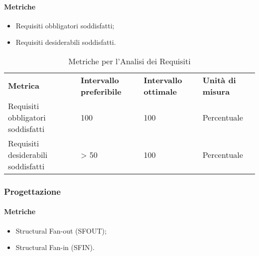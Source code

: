 \paragraph{Metriche}
\begin{itemize}
	\item Requisiti obbligatori soddisfatti;
	\item Requisiti desiderabili soddisfatti.
\end{itemize}
\renewcommand{\arraystretch}{2.2}
\begin{longtable}{|C{4.5cm}|C{2.25cm}|C{2.25cm}|C{3cm}|}

	\caption{Metriche per l'Analisi dei Requisiti }\\
	\hline

	\textbf{Metrica} & \textbf{Intervallo preferibile}  & \textbf{Intervallo ottimale} & \textbf{Unità di misura}
	\tabularnewline
	\endfirsthead

	Requisiti obbligatori soddisfatti &  100 & 100 & Percentuale \\
	Requisiti desiderabili soddisfatti &  > 50 & 100 & Percentuale \\
\end{longtable}
\pagebreak


\subsubsection{Progettazione}

\paragraph{Metriche}
\begin{itemize}
	\item Structural Fan-out (SFOUT);
	\item Structural Fan-in (SFIN).
\end{itemize}

